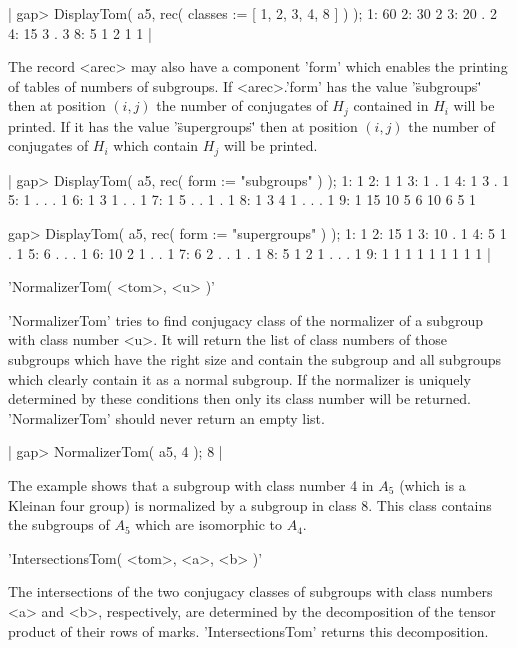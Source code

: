 |    gap> DisplayTom( a5, rec( classes := [ 1, 2, 3, 4, 8 ] ) );
    1:  60
    2:  30 2
    3:  20 . 2
    4:  15 3 . 3
    8:   5 1 2 1 1 |

The record <arec> may also  have a  component  'form' which  enables  the
printing of  tables of  numbers of subgroups.  If <arec>.'form'  has  the
value '\"subgroups\"' then  at position $(i,j)$  the number of conjugates
of $H_j$  contained  in  $H_i$  will  be  printed.  If it  has  the value
'\"supergroups\"' then at position $(i,j)$  the  number  of conjugates of
$H_i$ which contain $H_j$ will be printed.

|    gap> DisplayTom( a5, rec( form := "subgroups" ) );
    1:  1
    2:  1  1
    3:  1  .  1
    4:  1  3  . 1
    5:  1  .  . . 1
    6:  1  3  1 . .  1
    7:  1  5  . . 1  . 1
    8:  1  3  4 1 .  . . 1
    9:  1 15 10 5 6 10 6 5 1
    
    gap> DisplayTom( a5, rec( form := "supergroups" ) );
    1:   1
    2:  15 1
    3:  10 . 1
    4:   5 1 . 1
    5:   6 . . . 1
    6:  10 2 1 . . 1
    7:   6 2 . . 1 . 1
    8:   5 1 2 1 . . . 1
    9:   1 1 1 1 1 1 1 1 1 |


'NormalizerTom( <tom>, <u> )'

'NormalizerTom' tries  to  find conjugacy  class  of the normalizer  of a
subgroup with class number <u>.  It will return the list of class numbers
of those subgroups which have the right size and contain the subgroup and
all  subgroups  which  clearly contain it as  a normal subgroup.   If the
normalizer is uniquely determined by these conditions then only its class
number  will be returned.   'NormalizerTom' should  never return an empty
list.

|    gap> NormalizerTom( a5, 4 );
    8 |

The example shows that a subgroup with class number 4 in $A_5$ (which  is
a Kleinan four group) is normalized by a subgroup in class 8.  This class
contains the subgroups of $A_5$ which are isomorphic to $A_4$.


'IntersectionsTom( <tom>, <a>, <b> )'

The intersections of  the two  conjugacy classes of subgroups  with class
numbers <a> and <b>, respectively, are determined by the decomposition of
the tensor product of their rows  of  marks.   'IntersectionsTom' returns
this decomposition.

